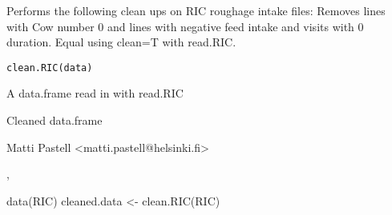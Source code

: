 \documentclass{book}
\begin{document}
\begin{Description}\relax
Performs the following clean ups on RIC roughage intake files:
Removes lines with Cow number 0 and lines with negative feed intake
and visits with 0 duration. Equal using clean=T with read.RIC.
\end{Description}
\begin{Usage}
\begin{verbatim}
clean.RIC(data)
\end{verbatim}
\end{Usage}
\begin{Arguments}
\begin{ldescription}
\item[\code{data}] A data.frame read in with read.RIC
\end{ldescription}
\end{Arguments}
\begin{Value}
Cleaned data.frame
\end{Value}
\begin{Author}\relax
Matti Pastell <matti.pastell@helsinki.fi>
\end{Author}
\begin{SeeAlso}\relax
{}, 
\end{SeeAlso}
\begin{Examples}
\begin{ExampleCode}
data(RIC)
cleaned.data <- clean.RIC(RIC)
\end{ExampleCode}
\end{Examples}
\end{document}
